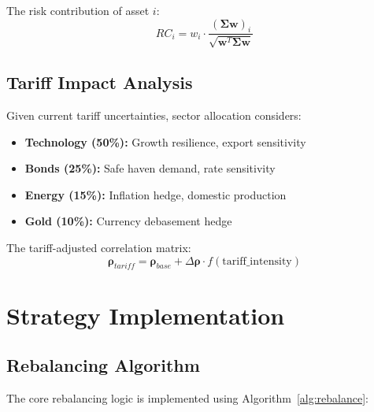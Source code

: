 \documentclass[11pt]{IEEEtran}
\begin{document}
The risk contribution of asset $i$:
\begin{equation}
RC_i = w_i \cdot \frac{(\boldsymbol{\Sigma} \mathbf{w})_i}{\sqrt{\mathbf{w}^T \boldsymbol{\Sigma} \mathbf{w}}}
\end{equation}

\begin{multicols}{2}

\subsection{Tariff Impact Analysis}

Given current tariff uncertainties, sector allocation considers:
\begin{itemize}
    \item \textbf{Technology (50\%):} Growth resilience, export sensitivity
    \item \textbf{Bonds (25\%):} Safe haven demand, rate sensitivity
    \item \textbf{Energy (15\%):} Inflation hedge, domestic production
    \item \textbf{Gold (10\%):} Currency debasement hedge
\end{itemize}

\end{multicols}

The tariff-adjusted correlation matrix:
\begin{equation}
\boldsymbol{\rho}_{tariff} = \boldsymbol{\rho}_{base} + \Delta \boldsymbol{\rho} \cdot f(\text{tariff\_intensity})
\end{equation}

\section{Strategy Implementation}

\subsection{Rebalancing Algorithm}

The core rebalancing logic is implemented using Algorithm~\ref{alg:rebalance}:
\end{document}
